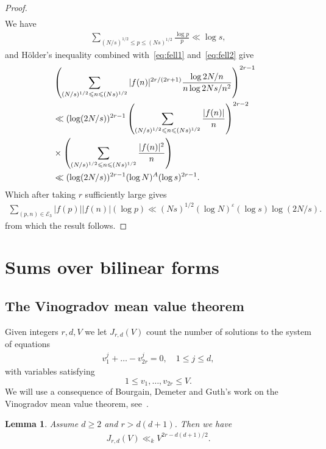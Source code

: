 \documentclass[12pt]{amsart}
\newtheorem{lemma}{Lemma}
\def\cE{{\mathcal E}}
\def\\{\cr}
\def\le{\leqslant}
\def\ge{\geqslant}
\begin{document}
\begin{proof}
\begin{align*}
\end{align*}
 We have 
\begin{align*}
\sum_{(N/s)^{1/2}\le p \le (Ns)^{1/2}}\frac{\log{p}}{p}\ll \log{s},
\end{align*}
and H\"{o}lder's inequality combined with~\eqref{eq:fell1} and~\eqref{eq:fell2} give 
\begin{align*}
&\left(\sum_{(N/s)^{1/2}\le n\le (Ns)^{1/2}}|f(n)|^{2r/(2r+1)}\frac{\log{2N/n}}{n\log{2Ns/n^2}}\right)^{2r-1} \\ &
\ll (\log(2N/s))^{2r-1}\left(\sum_{(N/s)^{1/2}\le n\le (Ns)^{1/2}}\frac{|f(n)|}{n}\right)^{2r-2}\\ & \times \left(\sum_{(N/s)^{1/2}\le n\le (Ns)^{1/2}}\frac{|f(n)|^2}{n}\right) \\ 
& \ll (\log(2N/s))^{2r-1}(\log{N})^{A}(\log{s})^{2r-1}.
\end{align*}
Which after taking $r$ sufficiently large gives 
\begin{align*}
\sum_{(p,n)\in \cE_3}|f(p)||f(n)|(\log{p})\ll (Ns)^{1/2}(\log{N})^{\varepsilon}(\log{s})\log{(2N/s)}.
\end{align*}
from which the result follows.
\end{proof}
\section{Sums over bilinear forms}
\label{s33}
\subsection{The Vinogradov mean value theorem}
\label{s3}
 Given integers $r,d,V$ we let $J_{r,d}(V)$ count the number of solutions to the system of equations 
\begin{align*}
v_1^{j}+\dots-v_{2r}^{j}=0, \quad 1\le j\le d,
\end{align*}
with variables satisfying
$$1\le v_1,\dots,v_{2r}\le V.$$
We will use a consequence of Bourgain, Demeter and Guth's work on the Vinogradov mean value theorem, see~\cite[Section~5]{BDG}.
\begin{lemma}
\label{lem:vmvt}
Assume $d\ge 2$ and $r >d(d+1)$.
Then we have 
\begin{align*}
J_{r,d}(V)\ll_k V^{2r-d(d+1)/2}.
\end{align*}
\end{lemma}
\end{document}
